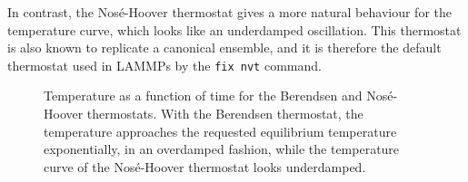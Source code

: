 \documentclass[11pt,british,a4paper]{report}
\begin{document}
In contrast, the Nosé-Hoover thermostat gives a more natural behaviour for the temperature curve, which looks like an underdamped oscillation. This thermostat is also known to replicate a canonical ensemble\cite{evans_nosehoover_1985}, and it is therefore the default thermostat used in LAMMPs by the \texttt{fix nvt} command.
\begin{figure}[htbp]
    \centering
    \caption{Temperature as a function of time for the Berendsen and Nosé-Hoover thermostats. With the Berendsen thermostat, the temperature approaches the requested equilibrium temperature exponentially, in an overdamped fashion, while the temperature curve of the Nosé-Hoover thermostat looks underdamped.}%
    \label{fig:thermostats}
\end{figure}









\nocite{*}
\printbibliography{}
\end{document}
